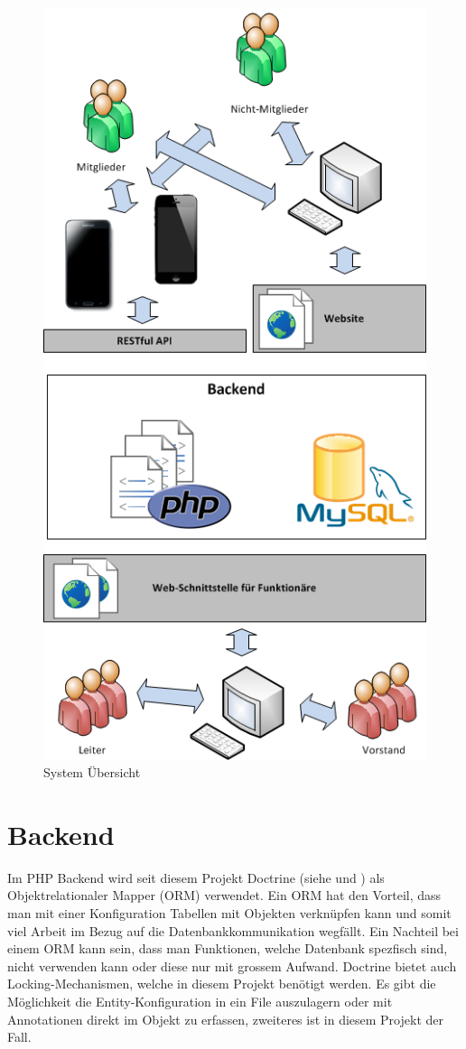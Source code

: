 \begin{figure}[h]
\centering
\includegraphics[scale=0.5]{images/visio/SystemScope.png}
\caption{System Übersicht}
\label{fig:system_scope}
\end{figure}

\section{Backend}\label{arch_backend}
Im PHP Backend wird seit diesem Projekt Doctrine (siehe \cite{doctrine} und \cite{dunglas2013persistence}) als Objektrelationaler Mapper (ORM) verwendet. Ein ORM hat den Vorteil, dass man mit einer Konfiguration Tabellen mit Objekten verknüpfen kann und somit viel Arbeit im Bezug auf die Datenbankkommunikation wegfällt. Ein Nachteil bei einem ORM kann sein, dass man Funktionen, welche Datenbank spezfisch sind, nicht verwenden kann oder diese nur mit grossem Aufwand. Doctrine bietet auch Locking-Mechanismen, welche in diesem Projekt benötigt werden. Es gibt die Möglichkeit die Entity-Konfiguration in ein File auszulagern oder mit Annotationen direkt im Objekt zu erfassen, zweiteres ist in diesem Projekt der Fall. 

